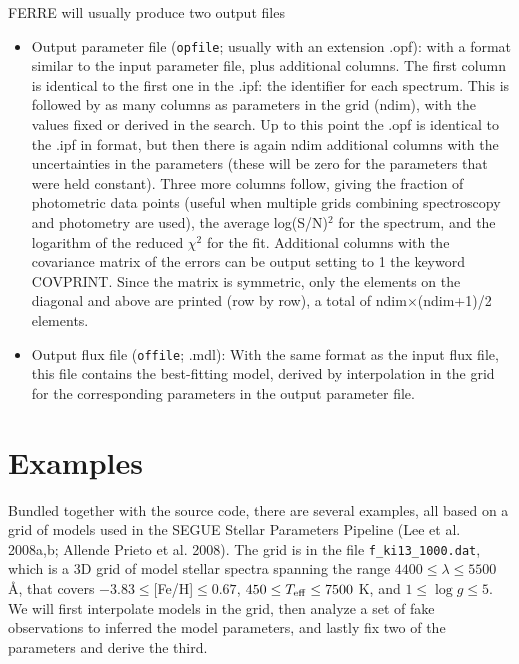 \documentclass[12pt]{article}
\begin{document}
FERRE will usually produce two output files
\begin{itemize}

\item Output parameter file ({\tt opfile}; usually with an extension .opf): 
with a format similar to the input parameter
file, plus additional columns. The first column is identical to the first one
in the .ipf: the identifier for each spectrum. This is followed by 
as many columns as parameters in the grid (ndim), with the values fixed or 
derived in the search. Up to 
this point the .opf is identical to the .ipf in format, but then there is
again ndim additional columns with the uncertainties in the parameters 
(these will be zero for the parameters that were held constant). Three more 
columns follow, giving the fraction of photometric data points (useful 
when multiple grids combining spectroscopy and photometry are used), the average 
log(S/N)$^2$ for the spectrum, and the logarithm of the reduced $\chi^2$ for the fit. 
Additional columns with the covariance matrix of 
the errors can be output setting to 1 the keyword COVPRINT. Since the matrix is 
symmetric, only the elements on the diagonal and above are printed (row by row), 
a total of ndim$\times$(ndim+1)/2 elements.

\item Output flux file ({\tt offile}; .mdl): With the same format as the input flux file, 
this file contains the best-fitting model, derived by interpolation in the 
grid for the corresponding parameters in the output parameter file.

\end{itemize}

\section{Examples}
\label{test}

Bundled together with the source code, there are several examples, 
all based on a grid of models used in the SEGUE Stellar Parameters  Pipeline
(Lee et al. 2008a,b; Allende Prieto et al. 2008). The grid is in the file
{\tt f\_ki13\_1000.dat}, which is a 3D grid of model stellar spectra spanning 
the range $4400\le \lambda \le 5500$ \AA,
that covers $-3.83\le$[Fe/H]$\le0.67$, $450\le T_{\rm eff} \le 7500$ K, 
and $1\le \log g \le 5$. We will first interpolate models in the grid, 
then analyze a set of fake observations to inferred the model parameters, and 
lastly fix two of the parameters and derive the third.
\end{document}

